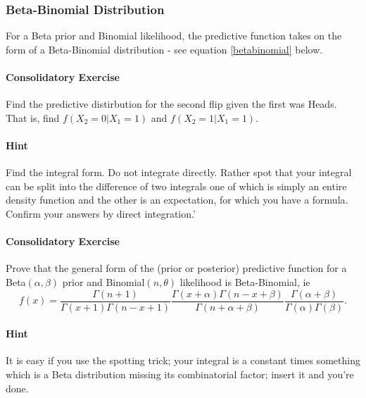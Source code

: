 \documentclass{article}
\begin{document}
\subsubsection{Beta-Binomial Distribution}
For a Beta prior and Binomial likelihood, the predictive function takes on the form of a Beta-Binomial distribution - see equation \eqref{betabinomial} below.

\begin{Exercise}
    \paragraph{Consolidatory Exercise} Find the predictive distirbution for the second flip given the first was Heads. That is, find $f(X_2=0|X_1=1)$ and $f(X_2=1|X_1=1)$.
    
    \paragraph{Hint} Find the integral form. Do not integrate directly. Rather spot that your integral can be split into the difference of two integrals one of which is simply an entire density function and the other is an expectation, for which you have a formula. Confirm your answers by direct integration.'
\end{Exercise}

\begin{Exercise}
    \paragraph{Consolidatory Exercise}
    Prove that the general form of the (prior or posterior) predictive function for a Beta$(\alpha, \beta)$ prior and Binomial$(n,\theta)$ likelihood is Beta-Binomial, ie  
    \begin{equation}
        f(x)=\frac{\Gamma(n+1)}{\Gamma(x+1)\Gamma(n-x+1)}
        \frac{\Gamma(x+\alpha)\Gamma(n-x+\beta)}{\Gamma(n+\alpha+\beta)}
        \frac{\Gamma(\alpha+\beta)}{\Gamma(\alpha)\Gamma(\beta)}.
        \label{betabinomial}
    \end{equation}
    
    \paragraph{Hint}
    It is easy if you use the spotting trick; your integral is a constant times something which is a Beta distribution missing its combinatorial factor; insert it and you're done.
\end{Exercise}
\end{document}
